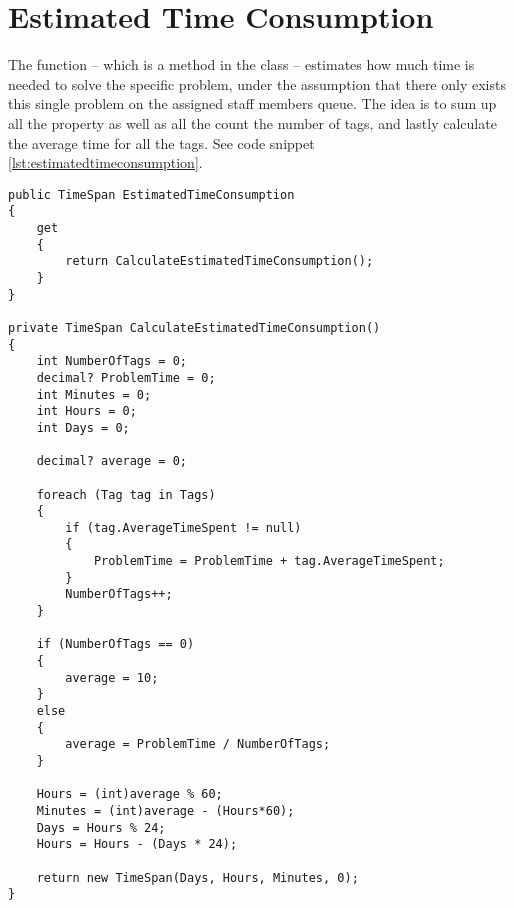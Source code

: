 \section{Estimated Time Consumption}
\label{sec:estimated_time_consumption}

The  function -- which is a method in the  class -- estimates how much time is needed to solve the specific problem, under the assumption that there only exists this single problem on the assigned staff members queue. The idea is to sum up all the  property as well as all the count the number of tags, and lastly calculate the average time for all the tags. See code snippet \ref{lst:estimatedtimeconsumption}.

\begin{lstlisting}[style=sourceCode, caption=\myCaption{The ManageTagTimes method. In lines one to seven a property is shown, which wraps the method in lines nine to forty-three.}, label=lst:estimatedtimeconsumption]
public TimeSpan EstimatedTimeConsumption
{
    get
    {
        return CalculateEstimatedTimeConsumption();
    }
}

private TimeSpan CalculateEstimatedTimeConsumption()
{
    int NumberOfTags = 0;
    decimal? ProblemTime = 0;
    int Minutes = 0;
    int Hours = 0;
    int Days = 0;

    decimal? average = 0;

    foreach (Tag tag in Tags)
    {
        if (tag.AverageTimeSpent != null)
        {
            ProblemTime = ProblemTime + tag.AverageTimeSpent;
        }
        NumberOfTags++;
    }

    if (NumberOfTags == 0)
    {
        average = 10;
    }
    else
    {
        average = ProblemTime / NumberOfTags;
    }

    Hours = (int)average % 60;
    Minutes = (int)average - (Hours*60);
    Days = Hours % 24;
    Hours = Hours - (Days * 24);

    return new TimeSpan(Days, Hours, Minutes, 0);
}
\end{lstlisting}